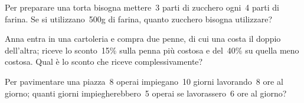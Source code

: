 \begin{htmulticols}{2}
\begin{esercizio}
\label{ese:3.197}
Per preparare una torta bisogna mettere~3 parti di zucchero ogni~4
parti di farina. Se si utilizzano~500g di farina, quanto zucchero
bisogna utilizzare? \sol{\dots}
\end{esercizio}



\begin{esercizio}
\label{ese:3.201}
 Anna entra in una cartoleria e compra due penne, di cui una costa il
doppio dell'altra; riceve lo sconto~15\% sulla penna
più costosa e del~40\% su quella meno costosa. Qual è lo sconto che
riceve complessivamente? 
\end{esercizio}

% 
% 

\begin{esercizio}
\label{ese:3.205}
Per pavimentare una piazza~8 operai impiegano~10 giorni
lavorando~8 ore al giorno; quanti giorni impiegherebbero~5 operai se
lavorassero~6 ore al giorno? \sol{\dots}
\end{esercizio}


\end{htmulticols}
